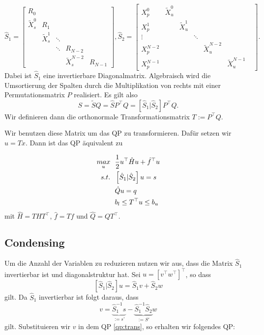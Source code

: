 $$\hat{S}_1=\left[\begin{array}{ccccccc}
R_0 &  &  &  &      \\
\tilde{X}_s^0 & R_1   &  &  &   \\
 & \tilde{X}^1_s  & \ddots &  & \\
   &  &   \ddots & R_{N-2} &   \\
 &  &    & \tilde{X}^{N-2}_s & R_{N-1}    
\end{array} \right],
\hat{S}_2=
\left[ \begin{array}{ccccccc}
X_p^0 & \tilde{X}^0_u &  &  &  & &  \\ 
 X_p^1 &  & \tilde{X}^1_u &  &    &  \\ 
 \vdots &  &    & \ddots &    \\ 
 X_p^{N-2} &    &  &  & \tilde{X}^{N-2}_u &  \\ 
 X_p^{N-1} &    &  &  &  & \tilde{X}^{N-1}_u
\end{array} \right].
$$
Dabei ist $\hat{S}_1$ eine invertierbare Diagonalmatrix. Algebraisch wird die Umsortierung der Spalten durch die Multiplikation von rechts mit einer Permutationsmatrix $P$ realisiert. Es gilt also 
$$S=\tilde{S}Q=\hat{S}P^\top Q=\left[\hat{S}_1 \vert \hat{S}_2 \right]P^\top Q.$$ Wir definieren dann die orthonormale Transformationsmatrix $T:=P^\top Q$.

Wir benutzen diese Matrix um das QP zu transformieren. Dafür setzen wir $u=Tx$. Dann ist das QP äquivalent zu 

\begin{align} \label{qp:trans}
\underset{u}{max} \ \ 	& \frac{1}{2}	u^\top \hat{H} u+\hat{f}^\top u \\
s.t. \ \ 				& \left[\hat{S}_1 \vert \hat{S}_2 \right]u=s \notag \\
						& \hat{Q} u =q \notag \\
						& b_l \leq T^\top u \leq b_u  \notag
\end{align}
mit $\hat{H}=T H T^\top$, $\hat{f}=Tf$ und $\hat{Q}=QT^\top$.


\subsection{Condensing}

Um die Anzahl der Variablen zu reduzieren nutzen wir aus, dass die Matrix $\hat{S}_1$ invertierbar ist und diagonalstruktur hat. Sei $u=[v^\top w^\top]^\top$, so dass $$\left[\hat{S}_1 \vert \hat{S}_2 \right]u=\hat{S}_1v+\hat{S}_2w$$ gilt. Da $\hat{S}_1$ invertierbar ist folgt daraus, dass $$v=\underbrace{\hat{S}^{-1}_1s}_{:=s’}-\underbrace{\hat{S}^{-1}_1\hat{S}_2}_{:=S'} w$$ gilt. Substituieren wir $v$ in dem QP \ref{qp:trans}, so erhalten wir folgendes QP:

